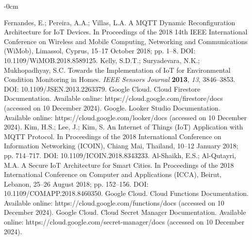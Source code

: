 \documentclass[journal]{Definitions/mdpi}
\begin{document}
\begin{adjustwidth}{-\extralength}{0cm}
\begin{thebibliography}{999}
Fernandes, E.; Pereira, A.A.; Villas, L.A. A MQTT Dynamic Reconfiguration Architecture for IoT Devices. In Proceedings of the 2018 14th IEEE International Conference on Wireless and Mobile Computing, Networking and Communications (WiMob), Limassol, Cyprus, 15–17 October 2018; pp. 1–8. DOI: 10.1109/WiMOB.2018.8589125.
Kelly, S.D.T.; Suryadevara, N.K.; Mukhopadhyay, S.C. Towards the Implementation of IoT for Environmental Condition Monitoring in Homes. {\em IEEE Sensors Journal} {\bf 2013}, {\em 13}, 3846–3853. DOI: 10.1109/JSEN.2013.2263379.
Google Cloud. Cloud Firestore Documentation. Available online: https://cloud.google.com/firestore/docs (accessed on 10 December 2024).
Google. Looker Studio Documentation. Available online: https://cloud.google.com/looker/docs (accessed on 10 December 2024).
Kim, H.S.; Lee, J.; Kim, S. An Internet of Things (IoT) Application with MQTT Protocol. In Proceedings of the 2018 International Conference on Information Networking (ICOIN), Chiang Mai, Thailand, 10–12 January 2018; pp. 714–717. DOI: 10.1109/ICOIN.2018.8343233.
Al-Shaikh, E.S.; Al-Qutayri, M.A. A Secure IoT Architecture for Smart Cities. In Proceedings of the 2018 International Conference on Computer and Applications (ICCA), Beirut, Lebanon, 25–26 August 2018; pp. 152–156. DOI: 10.1109/COMAPP.2018.8460350.
Google Cloud. Cloud Functions Documentation. Available online: https://cloud.google.com/functions/docs (accessed on 10 December 2024).
Google Cloud. Cloud Secret Manager Documentation. Available online: https://cloud.google.com/secret-manager/docs (accessed on 10 December 2024).
\end{thebibliography}

%


\end{adjustwidth}
\end{document}
